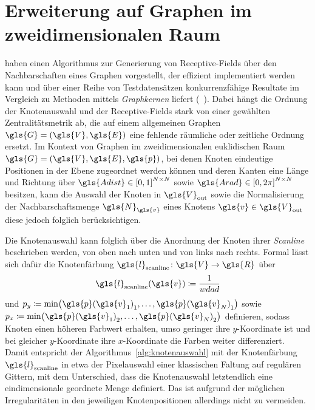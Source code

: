 \section{Erweiterung auf Graphen im zweidimensionalen Raum}
\label{raeumliche_erweiterung}

\citeauthor{patchy} haben einen Algorithmus zur Generierung von Receptive-Fields über den Nachbarschaften eines Graphen vorgestellt, der effizient implementiert werden kann und über einer Reihe von Testdatensätzen konkurrenzfähige Resultate im Vergleich zu Methoden mittels \emph{Graphkernen} liefert (\vgl{}~\cite{patchy}).
Dabei hängt die Ordnung der Knotenauswahl und der Receptive-Fields stark von einer gewählten Zentralitätsmetrik ab, die auf einem allgemeinen Graphen $\gls{G} = \left(\gls{V}, \gls{E}\right)$ eine fehlende räumliche oder zeitliche Ordnung ersetzt.
Im Kontext von Graphen im zweidimensionalen euklidischen Raum $\gls{G} = \left(\gls{V}, \gls{E}, \gls{p}\right)$, bei denen Knoten eindeutige Positionen in der Ebene zugeordnet werden können und deren Kanten eine Länge und Richtung über $\gls{Adist} \in {\left[0, 1\right]}^{N \times N}$ sowie $\gls{Arad} \in {\left[0, 2\pi\right]}^{N \times N}$ besitzen, kann die Auswahl der Knoten in $\gls{V}_{\mathrm{out}}$ sowie die Normalisierung der Nachbarschaftsmenge $\gls{N}_{\gls{v}}$ eines Knotens $\gls{v} \in \gls{V}_{\mathrm{out}}$ diese jedoch folglich berücksichtigen.

Die Knotenauswahl kann folglich über die Anordnung der Knoten \bzgl{} ihrer \emph{Scanline} beschrieben werden, \dhe{} von oben nach unten und von links nach rechts.
Formal lässt sich dafür die Knotenfärbung $\gls{l}_{\mathrm{scanline}} \colon \gls{V} \to \gls{R}$ über
\begin{equation*}
  \gls{l}_{\mathrm{scanline}}\left(\gls{v}\right) \coloneqq \frac{1}{wdad}
\end{equation*}
und $p_y \coloneqq \min \left({\gls{p}\left(\gls{v}_1\right)}_1, \ldots, {\gls{p}\left(\gls{v}_N\right)}_1\right)$ sowie $p_x \coloneqq \min \left({\gls{p}\left(\gls{v}_1\right)}_2, \ldots, {\gls{p}\left(\gls{v}_N\right)}_2\right)$ definieren, sodass Knoten einen höheren Farbwert erhalten, umso geringer ihre $y$-Koordinate ist und bei gleicher $y$-Koordinate ihre $x$-Koordinate die Farben weiter differenziert.
Damit entspricht der Algorithmus~\ref{alg:knotenauswahl} mit der Knotenfärbung $\gls{l}_{\mathrm{scanline}}$ in etwa der Pixelauswahl einer klassischen Faltung auf regulären Gittern, mit dem Unterschied, dass die Knotenauswahl letztendlich eine eindimensionale geordnete Menge definiert.
Das ist aufgrund der möglichen Irregularitäten in den jeweiligen Knotenpositionen allerdings nicht zu vermeiden.


